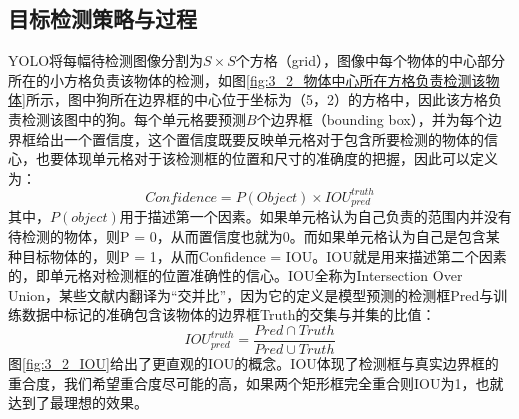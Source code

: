 \subsection{目标检测策略与过程}
YOLO将每幅待检测图像分割为$S\times S$个方格（grid），图像中每个物体的中心部分所在的小方格负责该物体的检测，如图\ref{fig:3_2_物体中心所在方格负责检测该物体}所示，图中狗所在边界框的中心位于坐标为（5，2）的方格中，因此该方格负责检测该图中的狗。每个单元格要预测$B$个边界框（bounding box），并为每个边界框给出一个置信度，这个置信度既要反映单元格对于包含所要检测的物体的信心，也要体现单元格对于该检测框的位置和尺寸的准确度的把握，因此可以定义为：
\begin{equation}
Confidence = P(Object) \times IOU_{pred}^{truth}
\end{equation}
其中，$P(object)$用于描述第一个因素。如果单元格认为自己负责的范围内并没有待检测的物体，则P = 0，从而置信度也就为0。而如果单元格认为自己是包含某种目标物体的，则P = 1，从而Confidence = IOU。IOU就是用来描述第二个因素的，即单元格对检测框的位置准确性的信心。IOU全称为Intersection Over Union，某些文献内翻译为“交并比”，因为它的定义是模型预测的检测框Pred与训练数据中标记的准确包含该物体的边界框Truth的交集与并集的比值：
\begin{equation}
IOU_{pred}^{truth} = \frac{Pred \cap Truth}{Pred \cup Truth}
\end{equation}
图\ref{fig:3_2_IOU}给出了更直观的IOU的概念。IOU体现了检测框与真实边界框的重合度，我们希望重合度尽可能的高，如果两个矩形框完全重合则IOU为1，也就达到了最理想的效果。

